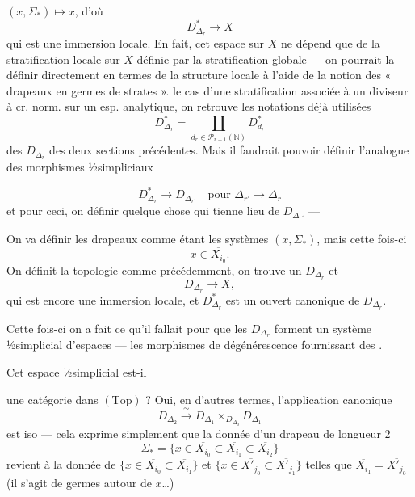 \documentclass[11pt,a4paper]{article}
\begin{document}

$(x,\Sigma_*) \longmapsto x$, d'où
\[
  D^{*}_{\Delta_r} \longrightarrow X \tag{301}
\]
qui est une immersion locale. En fait, cet espace sur $X$ ne dépend que de la  stratification locale sur $X$ définie par la stratification globale --- on pourrait la définir directement en termes de la structure locale à l'aide de la notion des « drapeaux en germes de strates ».    le cas d'une stratification associée à un diviseur à cr. norm. sur un esp. analytique, on retrouve les notations déjà utilisées
\[
  D^{*}_{\Delta_r} = \coprod_{d_r \in \mathcal{P}_{r+1}(\mathbb{N})} D^{*}_{d_r}
\]
des $D_{\Delta_r}$ des deux sections précédentes. Mais il faudrait pouvoir définir l'analogue des morphismes ½simpliciaux


\[
  D^{*}_{\Delta_r} \longrightarrow D_{\Delta_{r'}} \quad \text{pour } \Delta_{r'} \to \Delta_r
\]
et pour ceci, on   définir quelque chose qui tienne lieu de $D_{\Delta_{r'}}$ ---

On va définir les drapeaux   comme étant les systèmes $(x,\Sigma_*)$, mais cette fois-ci 
\[
  x \in \overline{X_{i_0}} .
\]
On définit la topologie comme précédemment, on trouve un $D_{\Delta_r}$ et
\[
  D_{\Delta_r} \longrightarrow X , \tag{302}
\]
qui est encore une immersion locale, et $D^{*}_{\Delta_r}$ est un ouvert canonique de $D_{\Delta_r}$.

Cette fois-ci on a fait ce qu'il fallait pour que les $D_{\Delta_r}$ forment un système ½simplicial d'espaces --- les morphismes de dégénérescence fournissant des \ill{}.

Cet espace ½simplicial est-il

une catégorie dans $(\mathrm{Top})$ ? Oui, en d'autres termes, l'application canonique
\[
  D_{\Delta_2} \xrightarrow{\ \sim\ } D_{\Delta_1} \times_{D_{\Delta_0}} D_{\Delta_1} \tag{303}
\]
est iso --- cela exprime simplement que la donnée d'un drapeau  de longueur $2$
\[
  \Sigma_* = \{x \in \overline{X_{i_0}} \subset \overline{X_{i_1}} \subset \overline{X_{i_2}}\}
\]
revient à la donnée de $\{x \in \overline{X_{i_0}} \subset \overline{X_{i_1}}\}$ et $\{x \in \overline{X'_{j_0}} \subset \overline{X'_{j_1}}\}$ telles que $\overline{X_{i_1}} = \overline{X'_{j_0}}$ (il s'agit de germes autour de $x$…)
\end{document}
